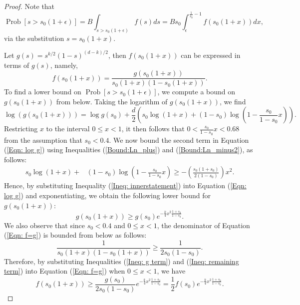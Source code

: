\documentclass[twoside,11pt]{article}
\newcommand{\pP}[1]{\operatorname{Prob}\left[ #1 \right] }
\begin{document}
				\begin{proof}
Note that 
					\begin{equation} \label{Eqn: plus B int}
						\pP{s>s_0(1+\epsilon)} = B \int_{s>s_0(1+\epsilon)} f(s)ds=Bs_0 \int_\epsilon^{\frac{1}{s_0}-1} f(s_0(1+x)) dx, 
					\end{equation}
					via the substitution $s=s_0(1+x)$.

					Let $g(s) = s^{k/2}(1-s)^{(d-k)/2}$, then $f(s_0(1+x))$ can be expressed in terms of $g(s)$, namely,
					\begin{equation} \label{Eqn: f=g}
						f(s_0(1+x)) = \frac{g(s_0(1+x))}{s_0(1+x)\left(1-s_0(1+x)\right)}.
					\end{equation}
					To find a lower bound on $\pP{s>s_0(1+\epsilon)}$, we compute a bound on $g(s_0(1+x))$ from below. Taking the logarithm of $g(s_0(1+x))$, we find
					\begin{equation} \label{Eqn: log g}
						\log \left( g(s_0(1+x)) \right) = \log g(s_0) + \frac{d}{2}\left( s_0 \log (1+x) + (1-s_0)\log\left(1-\frac{s_0}{1-s_0}x\right)\right).
					\end{equation}		
					Restricting $x$ to the interval $0\leq x<1$, it then follows that $0< \frac{s_0}{1-s_0}x<0.68$ from the assumption that $s_0<0.4$.  We now bound the second term in Equation (\ref{Eqn: log g}) using Inequalities (\ref{Bound:Ln_plus}) and (\ref{Bound:Ln_minus2}), as follows:	
					\begin{align}
					 s_0 \log (1+x) + & (1-s_0)\log \left(1-\frac{s_0}{1-s_0}x\right)  
					 							 \geq   -\left(\frac{s_0(1+s_0)}{2(1-s_0)}\right)x^2. \label{Ineq: innerstatement}
					\end{align}
					Hence, by substituting Inequality (\ref{Ineq: innerstatement}) into Equation (\ref{Eqn: log g}) and exponentiating, we obtain the following lower bound for $g(s_0(1+x))$:
					\begin{equation} \label{Ineq: g term}
					g(s_0(1+x)) \geq g(s_0) e^{-\frac{k}{4}x^2\frac{1+s_0}{1-s_0} }.
					\end{equation}
					We also observe that since $s_0<0.4$ and $0\leq x<1$, the denominator of Equation (\ref{Eqn: f=g}) is bounded from below as follows:
					\begin{equation} \label{Ineq: remaining term}
						 \frac{1}{s_0(1+x)(1-s_0(1+x))} \geq \frac{1}{2s_0(1-s_0)}.
						 \end{equation}
					Therefore, by substituting Inequalities (\ref{Ineq: g term}) and (\ref{Ineq: remaining term}) into Equation (\ref{Eqn: f=g}) when $0\leq x<1$, we have
					\begin{equation}\label{ineq:f-lowerbound}
					f(s_0(1+x)) \geq  \frac{g(s_0)}{2s_0(1-s_0)} e^{-\frac{k}
						{4}x^2\frac{1+s_0}{1-s_0}} = \frac{1}{2}f(s_0)e^{-\frac{k}{4}x^2\frac{1+s_0}{1-s_0}}.
						\end{equation}


\end{proof}
\end{document}
